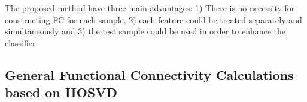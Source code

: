 \documentclass[journal]{IEEEtran}
\begin{document}
	The proposed method have three main advantages: 1) There is no necessity for constructing FC for each sample, 2) each feature could be treated separately and simultaneously and 3) the test sample could be used in order to enhance the classifier. 
	
	
%	
%	

	\subsection{General Functional Connectivity Calculations based on HOSVD} \label{FC_Construction}
	
	
%	
\end{document}
